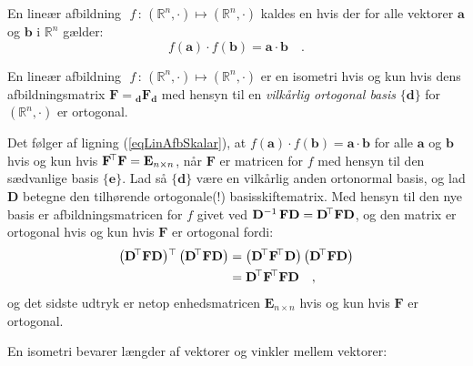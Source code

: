 \begin{definition}
En lineær afbildning $\,\,f\, : \, (\mathbb{R}^{n}, \cdot) \mapsto (\mathbb{R}^{n}, \cdot)$ kaldes en  hvis der for alle vektorer  $\mathbf{a}$ og $\mathbf{b}$ i $\mathbb{R}^{n}$ gælder:
\begin{equation}
f(\mathbf{a}) \cdot f(\mathbf{b}) = \mathbf{a} \cdot \mathbf{b} \quad .
\end{equation}
\end{definition}

\begin{theorem}
En lineær afbildning $\,\,f\, : \, (\mathbb{R}^{n}, \cdot) \mapsto (\mathbb{R}^{n}, \cdot)$ er en isometri hvis og kun hvis dens afbildningsmatrix $\mathbf{F} = {_{\mathbf{d}}}\mathbf{F}{_{\mathbf{d}}}$ med hensyn til en {\em{vilkårlig ortogonal basis}} $\{ \mathbf{d} \}$ for $(\mathbb{R}^{n}, \cdot)$  er ortogonal.
\end{theorem}
\begin{bevis}
Det følger af ligning (\ref{eqLinAfbSkalar}), at $f(\mathbf{a}) \cdot f(\mathbf{b}) = \mathbf{a} \cdot \mathbf{b}$ for alle $\mathbf{a}$ og $\mathbf{b}$ hvis og kun hvis $\mathbf{F}\hspace*{-.6mm}^{\top} \mathbf{F} = \mathbf{E}_{n \times n}$, når $\mathbf{F}$ er matricen for $f$ med hensyn til den sædvanlige basis $\{ \mathbf{e} \}$. Lad så $\{ \mathbf{d} \}$ være en vilkårlig anden ortonormal basis, og lad $\mathbf{D}$ betegne den tilhørende ortogonale(!) basisskiftematrix. Med hensyn til den nye basis er afbildningsmatricen for $f$ givet ved $\mathbf{D}^{-1}\,\mathbf{F}\mathbf{D} = \mathbf{D}\hspace*{-.6mm}^{\top} \mathbf{F} \mathbf{D}$, og den matrix er ortogonal hvis og kun hvis $\mathbf{F}$ er ortogonal fordi:
\begin{equation}
\begin{aligned}
\left(\mathbf{D}\hspace*{-.6mm}^{\top} \mathbf{F}\mathbf{D}\right)\hspace*{-.6mm}^{\top}\left(\mathbf{D}\hspace*{-.6mm}^{\top} \mathbf{F}\mathbf{D}\right) &= \left(\mathbf{D}\hspace*{-.6mm}^{\top} \mathbf{F}\hspace*{-.6mm}^{\top} \mathbf{D}\right)\left(\mathbf{D}\hspace*{-.6mm}^{\top} \mathbf{F}\mathbf{D}\right)\\
 &=  \mathbf{D}\hspace*{-.6mm}^{\top} \mathbf{F}\hspace*{-.6mm}^{\top} \mathbf{F}\mathbf{D} \quad ,
\end{aligned}
\end{equation}
og det sidste udtryk er netop enhedsmatricen $\mathbf{E}_{n \times n}$ hvis og kun hvis $\mathbf{F}$ er ortogonal.
\end{bevis}


En isometri bevarer længder af vektorer og vinkler mellem vektorer:

